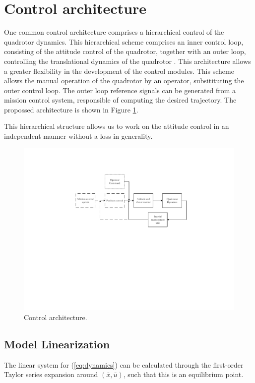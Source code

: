 \documentclass[12pt]{article}
\begin{document}
\section{Control architecture}
One common control architecture comprises a hierarchical control of the quadrotor dynamics. This hierarchical scheme comprises an inner control loop, consisting of the attitude control of the quadrotor, together with an outer loop, controlling the translational dynamics of the quadrotor \cite{Raff10}. This architecture allows a greater flexibility in the development of the control modules. This scheme allows the manual operation of the quadrotor by an operator, subsitituting the outer control loop. The outer loop reference signals can be generated from a mission control system, responsible of computing the desired trajectory. The propossed architecture is shown in Figure \ref{fig:control}.

This hierarchical structure allows us to work on the attitude control in an independent manner without a loss in generality.

\begin{figure}
  \centering
  \includegraphics{control.pdf}
  \caption{Control architecture.}
  \label{fig:control}
\end{figure}

\subsection{Model Linearization}
The linear system for (\ref{eq:dynamics}) can be calculated through the first-order Taylor series expansion around $\left (\bar{x},\bar{u} \right )$, such that this is an equilibrium point.
\end{document}
